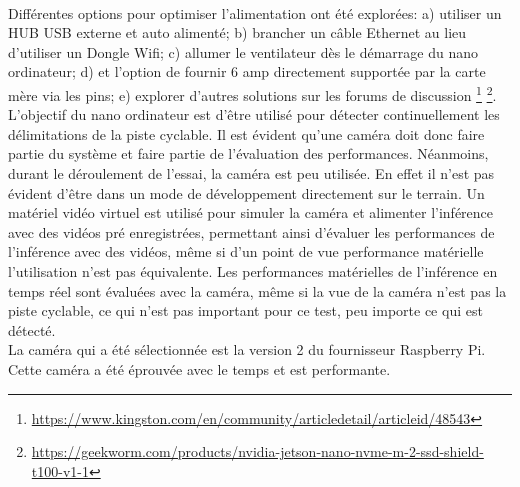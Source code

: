 \vspace{\baselineskip}
\\
\noindent Différentes options pour optimiser l'alimentation ont été explorées: a) utiliser un HUB USB externe et auto alimenté; b) brancher un câble Ethernet au lieu d'utiliser un Dongle Wifi; c) allumer le ventilateur dès le démarrage du nano ordinateur; d) et l'option de fournir 6 amp directement supportée par la carte mère via les pins; e) explorer d'autres solutions sur les forums de discussion \footnote{\url{https://www.kingston.com/en/community/articledetail/articleid/48543}} \footnote{\url{https://geekworm.com/products/nvidia-jetson-nano-nvme-m-2-ssd-shield-t100-v1-1}}.
\vspace{\baselineskip}
\\
\noindent L'objectif du nano ordinateur est d'être utilisé pour détecter continuellement les délimitations de la piste cyclable. Il est évident qu'une caméra doit donc faire partie du système et faire partie de l'évaluation des performances. Néanmoins, durant le déroulement de l'essai, la caméra est peu utilisée. En effet il n'est pas évident d'être dans un mode de développement directement sur le terrain. Un matériel vidéo virtuel est utilisé pour simuler la caméra et alimenter l'inférence avec des vidéos pré enregistrées, permettant ainsi d'évaluer les performances de l'inférence avec des vidéos, même si d'un point de vue performance matérielle l'utilisation n'est pas équivalente. Les performances matérielles de l'inférence en temps réel sont évaluées avec la caméra, même si la vue de la caméra n'est pas la piste cyclable, ce qui n'est pas important pour ce test, peu importe ce qui est détecté. 
\vspace{\baselineskip}
\\
\noindent La caméra qui a été sélectionnée est la version 2 du fournisseur Raspberry Pi. Cette caméra a été éprouvée avec le temps et est performante. 
\vspace{\baselineskip}
\\
